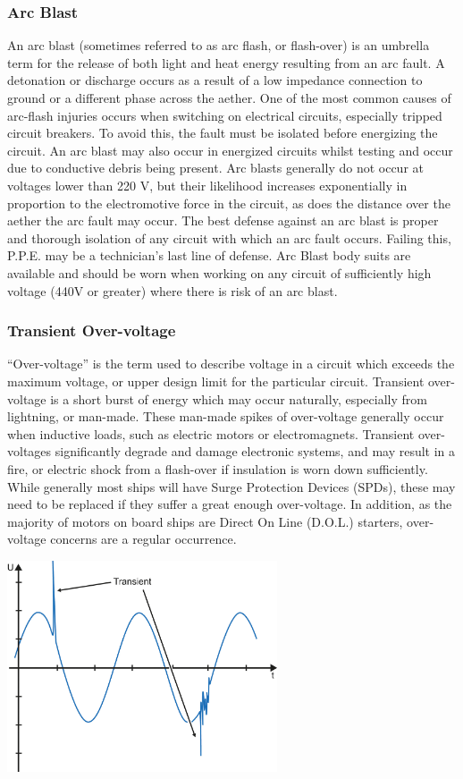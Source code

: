 \documentclass[11pt,a4paper]{article}
\begin{document}
\subsubsection{Arc Blast}
An arc blast (sometimes referred to as arc flash, or flash-over) is an umbrella term for the release of both light and heat energy resulting from an arc fault. A detonation or discharge occurs as a result of a low impedance connection to ground or a different phase across the aether. One of the most common causes of arc-flash injuries occurs when switching on electrical circuits, especially tripped circuit breakers. To avoid this, the fault must be isolated before energizing the circuit. An arc blast may also occur in energized circuits whilst testing and occur due to conductive debris being present. Arc blasts generally do not occur at voltages lower than 220 V, but their likelihood increases exponentially in proportion to the electromotive force in the circuit, as does the distance over the aether the arc fault may occur. The best defense against an arc blast is proper and thorough isolation of any circuit with which an arc fault occurs. Failing this, P.P.E. may be a technician’s last line of defense. Arc Blast body suits are available and should be worn when working on any circuit of sufficiently high voltage (440V or greater) where there is risk of an arc blast.

\subsubsection{Transient Over-voltage}
“Over-voltage” is the term used to describe voltage in a circuit which exceeds the maximum voltage, or upper design limit for the particular circuit. Transient over-voltage is a short burst of energy which may occur naturally, especially from lightning, or man-made. These man-made spikes of over-voltage generally occur when inductive loads, such as electric motors or electromagnets. Transient over-voltages significantly degrade and damage electronic systems, and may result in a fire, or electric shock from a flash-over if insulation is worn down sufficiently. While generally most ships will have Surge Protection Devices (SPDs), these may need to be replaced if they suffer a great enough over-voltage. In addition, as the majority of motors on board ships are Direct On Line (D.O.L.) starters, over-voltage concerns are a regular occurrence.
\begin{center}
\includegraphics[width=8cm]{transient}
\end{center}
\end{document}
